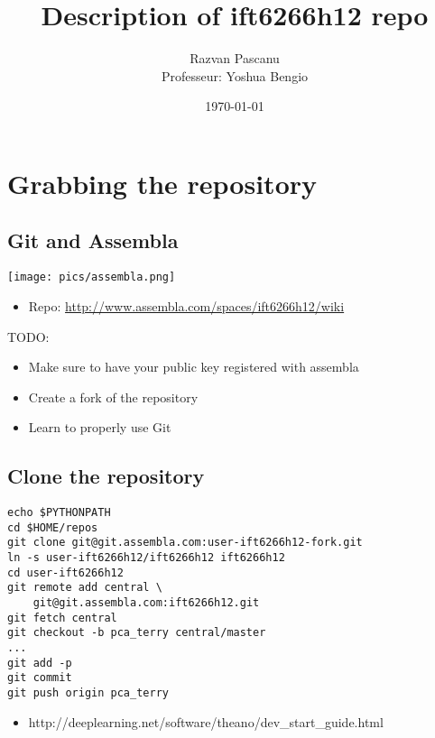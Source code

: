 \documentclass[9pt]{beamer}
\title[Description of ift6266h12 repo]{Description of ift6266h12 repo}
\author[Razvan Pascanu]{Razvan Pascanu\\ Professeur: Yoshua Bengio}
\date{\today}
\begin{document}
\frame{\titlepage}


\section{Grabbing the repository}
\subsection{Git and Assembla}
\begin{frame}
        \texttt{[image: pics/assembla.png]} 
    \begin{itemize}
        \item Repo: \url{http://www.assembla.com/spaces/ift6266h12/wiki}
    \end{itemize}
    {\color{darkred}TODO}:
    \begin{itemize}
        \item Make sure to have your public key registered with assembla
        \item Create a fork of the repository
        \item Learn to properly use {\color{darkred} Git}
    \end{itemize}
\end{frame}

\subsection{Clone the repository}
\begin{frame}[fragile]

    \begin{verbatim}
echo $PYTHONPATH
cd $HOME/repos
git clone git@git.assembla.com:user-ift6266h12-fork.git
ln -s user-ift6266h12/ift6266h12 ift6266h12
cd user-ift6266h12
git remote add central \
    git@git.assembla.com:ift6266h12.git
git fetch central
git checkout -b pca_terry central/master
...
git add -p
git commit
git push origin pca_terry
    \end{verbatim}
    \begin{itemize}
      \item  http://deeplearning.net/software/theano/dev\_start\_guide.html
    \end{itemize}
\end{frame}
\end{document}
